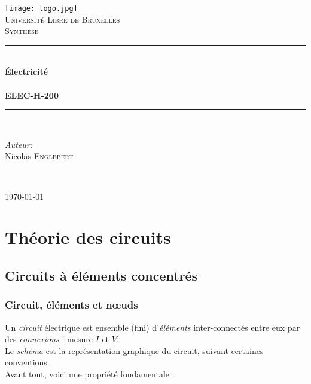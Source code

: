 \documentclass	[11pt, a4paper, openany]{book}
\begin{document}
\renewcommand{\proofname}{Démonstration}
\frontmatter
\begin{titlepage}
\begin{center}	
	
	\newcommand{\HRule}{\rule{\linewidth}{0.5mm}}   			%
	\texttt{[image: logo.jpg]}~\\[1cm]				%

	\textsc{\LARGE Université Libre de Bruxelles}\\[1.5cm]
	\textsc{\Large Synthèse}\\[0.5cm]

	\HRule \\[0.4cm]
	{ \huge \bfseries Électricité \\ \ \\ ELEC-H-200 \\[0.4cm] }


	\HRule \\[1.5cm]
		\begin{minipage}{0.4\textwidth}
		\begin{flushleft} \large
		
		\emph{Auteur:}\\
			Nicolas \textsc{Englebert}\\
			\end{flushleft}
			\end{minipage}
			\begin{minipage}{0.4\textwidth}
			\begin{flushright} \large
			\emph{} \\		
			\textsc{}
			\end{flushright}
		\end{minipage}

	\vfill

{\large \today}

\end{center}
\end{titlepage}

\tableofcontents




\mainmatter
\part{Théorie des circuits}
\chapter{Circuits à éléments concentrés}
\section{Circuit, éléments et nœuds}
Un \textit{circuit} électrique est ensemble  (fini) d'\textit{éléments} inter-connectés entre eux par des \textit{connexions} : mesure $I$ et $V$.\\
 Le \textit{schéma} est la représentation graphique du circuit, suivant certaines conventions.\\
Avant tout, voici une propriété fondamentale :\\
\end{document}
